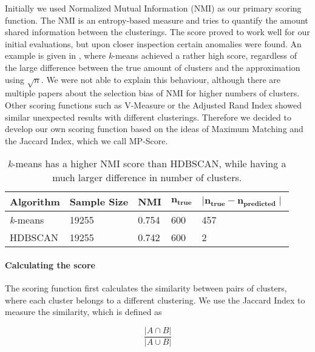 Initially we used Normalized Mutual Information (NMI) as our primary scoring function.
The NMI is an entropy-based measure and tries to quantify the amount shared information between the clusterings.
The score proved to work well for our initial evaluations, but upon closer inspection certain anomalies were found.
An example is given in , where \textit{k}-means achieved a rather high score,
regardless of the large difference between the true amount of clusters and the approximation using $\sqrt{n}$.
We were not able to explain this behaviour, although there are multiple papers
about the selection bias of NMI for higher numbers of clusters\cite{LEI201758, clustering_anmi}.
Other scoring functions such as V-Measure or the Adjusted Rand Index
showed similar unexpected results with different clusterings.
Therefore we decided to develop our own scoring function based on the ideas of Maximum Matching\cite{data_mining}
and the Jaccard Index, which we call MP-Score.

\begin{table}[h]
    \centering
    \begin{tabular}{|l|l|l|l|l|}
    \hline
    \textbf{Algorithm} & \textbf{Sample Size} & \textbf{NMI}  & $\mathbf{n_{true}}$ & $\mathbf{ \mid n_{true} - n_{predicted} \mid }$ \\ \hline
    \textit{k}-means & 19255 & 0.754 & 600 & 457 \\ \hline
    HDBSCAN & 19255 & 0.742 & 600 & 2 \\ \hline
    \end{tabular}
    \caption{
        \textit{k}-means has a higher NMI score than HDBSCAN,
        while having a much larger difference in number of clusters.
    }
    \label{tab:nmi_kmeans_example}
\end{table}

\paragraph{Calculating the score}
The scoring function first calculates the similarity between pairs of clusters,
where each cluster belongs to a different clustering.
We use the Jaccard Index to measure the similarity, which is defined as

\begin{equation}
    \label{equ:similarity}
    \frac{|A \cap B|}{|A \cup B|}
\end{equation}

